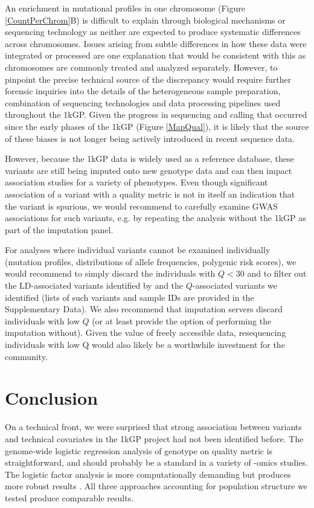 \documentclass[9pt,article]{template}
\begin{document}
An enrichment in mutational profiles in one chromosome (Figure \ref{CountPerChrom}B) is difficult to explain through biological mechanisms or sequencing technology as neither are expected to produce systematic differences across chromosomes. 
Issues arising from subtle differences in how these data were integrated or processed are one explanation that would be consistent with this as chromosomes are commonly treated and analyzed separately.
However, to pinpoint the precise technical source of the discrepancy would require further forensic inquiries into the details of the heterogeneous sample preparation, combination of sequencing technologies and data processing pipelines used throughout the 1kGP. 
Given the progress in sequencing and calling that occurred since the early phases of the 1kGP (Figure \ref{MapQual}), it is likely that the source of these biases is not longer being actively introduced in recent sequence data.

However, because the 1kGP data is widely used as a reference database, these variants are still being imputed onto new genotype data and can then impact association studies for a variety of phenotypes. 
Even though significant association of a variant with a quality metric is not in itself an indication that the variant is spurious, we would recommend to carefully examine GWAS associations for such variants, e.g. by repeating the analysis without the 1kGP as part of the imputation panel. 

For analyses where individual variants cannot be examined individually (mutation profiles, distributions of allele frequencies, polygenic risk scores), we would recommend to simply discard the individuals with $Q<30$ and to filter out the LD-associated variants identified by \cite{mafessoni2018turning} and the $Q$-associated variants we identified (lists of such variants and sample IDs are provided in the Supplementary Data). We also recommend that imputation servers discard individuals with low $Q$ (or at least provide the option of performing the imputation without). Given the value of freely accessible data, resequencing individuals with low Q would  also likely be a worthwhile investment for the community. 

\section{Conclusion}

On a technical front, we were surprised that strong association between variants and technical covariates in the 1kGP project had not been identified before. 
The genome-wide logistic regression analysis of genotype on quality metric is straightforward, and should probably be a standard in a variety of -omics studies. 
The logistic factor analysis is more computationally demanding but produces more robust results \citep{song2015testing}. 
All three approaches accounting for population structure we tested produce comparable results.  
\end{document}
